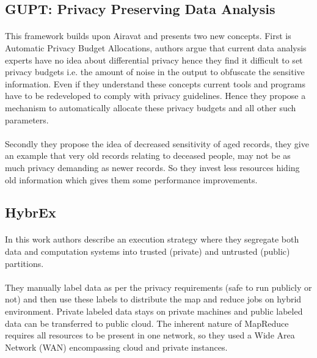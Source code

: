 \documentclass[12pt]{report}
\theoremstyle{named}
\begin{document}
\subsection{GUPT: Privacy Preserving Data Analysis}
\paragraph{}
This framework \cite{mohan2012gupt} builds upon Airavat \cite{roy2010airavat} and presents two new concepts. First is Automatic Privacy Budget Allocations, authors argue that current data analysis experts have no idea about differential privacy hence they find it difficult to set privacy budgets i.e. the amount of noise in the output to obfuscate the sensitive information. Even if they understand these concepts current tools and programs have to be redeveloped to comply with privacy guidelines. Hence they propose a mechanism to automatically allocate these privacy budgets and all other such parameters.
\paragraph{}
Secondly they propose the idea of decreased sensitivity of aged records, they give an example that very old records relating to deceased people, may not be as much privacy demanding as newer records. So they invest less resources hiding old information which gives them some performance improvements.
\subsection{HybrEx}
\paragraph{}
In this work \cite{ko2011hybrex} authors describe an execution strategy where they segregate both data and computation systems into trusted (private) and untrusted (public) partitions.
\paragraph{}
They manually label data as per the privacy requirements (safe to run publicly or not) and then use these labels to distribute the map and reduce jobs on hybrid environment. Private labeled data stays on private machines and public labeled data can be transferred to public cloud. The inherent nature of MapReduce requires all resources to be present in one network, so they used a Wide Area Network (WAN) encompassing cloud and private instances.
\end{document}

